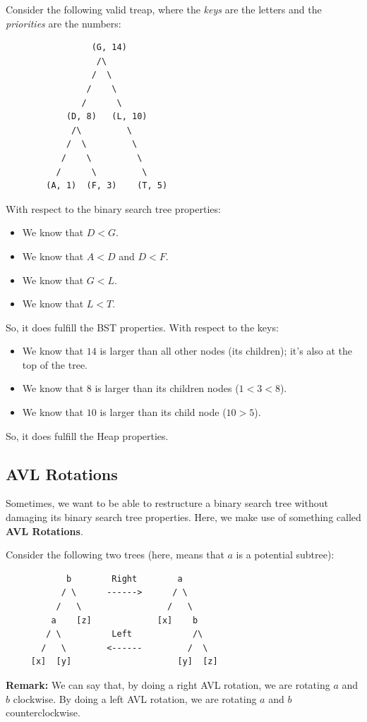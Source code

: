 \documentclass[letterpaper]{article}
\begin{document}
Consider the following valid treap, where the \emph{keys} are the letters and the \emph{priorities} are the numbers: 
\begin{verbatim}
                 (G, 14)
                  /\ 
                 /  \ 
                /    \ 
               /      \ 
            (D, 8)   (L, 10)
             /\         \ 
            /  \         \ 
           /    \         \ 
          /      \         \ 
        (A, 1)  (F, 3)    (T, 5)
\end{verbatim}
With respect to the binary search tree properties: 
\begin{itemize}
    \item We know that $D < G$. 
    \item We know that $A < D$ and $D < F$. 
    \item We know that $G < L$. 
    \item We know that $L < T$. 
\end{itemize}
So, it does fulfill the BST properties. With respect to the keys: 
\begin{itemize}
    \item We know that $14$ is larger than all other nodes (its children); it's also at the top of the tree. 
    \item We know that $8$ is larger than its children nodes ($1 < 3 < 8$). 
    \item We know that $10$ is larger than its child node ($10 > 5$). 
\end{itemize}
So, it does fulfill the Heap properties. 

\subsection{AVL Rotations}
Sometimes, we want to be able to restructure a binary search tree without damaging its binary search tree properties. Here, we make use of something called \textbf{AVL Rotations}.

\bigskip 

Consider the following two trees (here, \code{[a]} means that $a$ is a potential subtree): 
\begin{verbatim}
            b        Right        a
           / \      ------>      / \ 
          /   \                 /   \ 
         a    [z]             [x]    b
        / \          Left            /\
       /   \        <------         /  \
     [x]  [y]                     [y]  [z]
\end{verbatim}
\textbf{Remark:} We can say that, by doing a right AVL rotation, we are rotating $a$ and $b$ clockwise. By doing a left AVL rotation, we are rotating $a$ and $b$ counterclockwise. 
\end{document}
